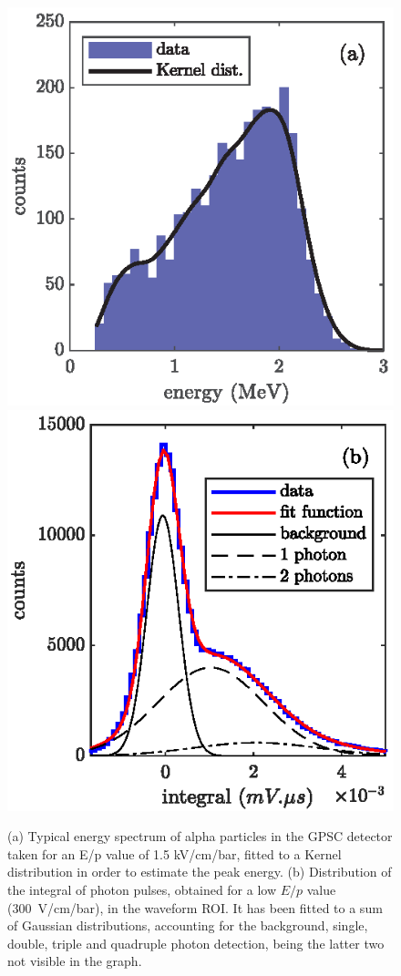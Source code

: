 \documentclass[%
 reprint,
superscriptaddress,
 amsmath,amssymb,
 aps,
]{revtex4-2}
\begin{document}
\begin{figure}[h!!!]
\centering %
\includegraphics[]{Fig9a.eps}
\includegraphics[]{Fig9b.eps}
\hfill
\caption{\label{fig:dist}(a) Typical energy spectrum of alpha particles in the GPSC detector taken for an E/p value of 1.5 kV/cm/bar, fitted to a Kernel distribution in order to estimate the peak energy. (b) Distribution of the integral of photon pulses, obtained for a low $E/p$ value (300~V/cm/bar), in the waveform ROI. It has been fitted to a sum of Gaussian distributions, accounting for the background, single, double, triple and quadruple photon detection, being the latter two not visible in the graph.}
\end{figure}
\end{document}
